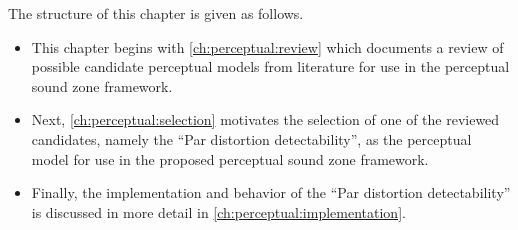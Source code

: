 The structure of this chapter is given as follows.
\begin{itemize}
    \item This chapter begins with \autoref{ch:perceptual:review} which documents a review of 
        possible candidate perceptual models from literature for use in the perceptual sound zone framework. 
    \item Next, \autoref{ch:perceptual:selection} motivates the selection of one of the reviewed candidates, 
        namely the ``Par distortion detectability'', as the perceptual model for use in the 
        proposed perceptual sound zone framework.
    \item Finally, the implementation and behavior of the ``Par distortion detectability'' is discussed in more detail in 
        \autoref{ch:perceptual:implementation}.
\end{itemize}
